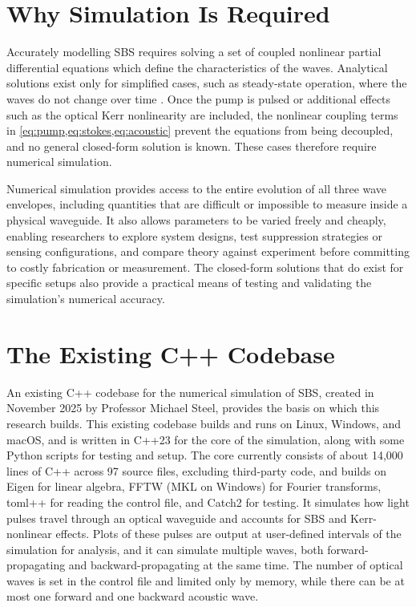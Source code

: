 \section{Why Simulation Is Required}

Accurately modelling SBS requires solving a set of coupled nonlinear partial differential equations which define the characteristics 
of the waves. Analytical solutions exist only for simplified cases, such as steady-state operation, where the waves do not change over 
time \parencite{agrawalNonlinearFiberOptics2019}. Once the pump is pulsed or additional effects such as the optical Kerr nonlinearity 
are included, the nonlinear coupling terms in \cref{eq:pump,eq:stokes,eq:acoustic} prevent the equations from being decoupled, and no 
general closed-form solution is known. These cases therefore require numerical simulation.

Numerical simulation provides access to the entire evolution of all three wave envelopes, 
including quantities that are difficult or impossible to measure inside a physical waveguide. It also allows parameters to be varied 
freely and cheaply, enabling researchers to explore system designs, test suppression strategies or sensing configurations, and compare 
theory against experiment before committing to costly fabrication or measurement. The closed-form solutions that do exist for specific 
setups also provide a practical means of testing and validating the simulation's numerical accuracy.


\section{The Existing C++ Codebase}

An existing C++ codebase for the numerical simulation of SBS, created in November 2025 by Professor Michael Steel, provides the basis
on which this research builds. This existing codebase builds and runs on Linux, Windows, and macOS, and is written in C++23 for the core
of the simulation, along with some Python scripts for testing and setup.
The core currently consists of about 14,000 lines of C++ across 97 source files, excluding third-party code, and builds on Eigen for linear algebra, FFTW (MKL on Windows) for Fourier transforms, toml++ for reading the control file, and Catch2 for testing.
It simulates how light pulses travel through an optical waveguide and accounts for SBS and Kerr-nonlinear effects.
Plots of these pulses are output at user-defined intervals of the simulation for analysis, and it can simulate multiple waves, both forward-propagating
and backward-propagating at the same time. The number of optical waves is set in the control file and limited only by memory,
while there can be at most one forward and one backward acoustic wave.

